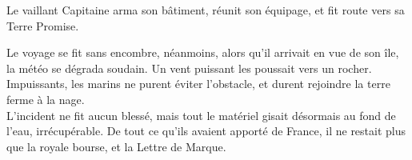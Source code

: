 \culdelampe{}

Le vaillant Capitaine arma son bâtiment, réunit son équipage, et fit route vers sa Terre Promise.

Le voyage se fit sans encombre, néanmoins, alors qu'il arrivait en vue de son île, la météo se dégrada soudain. Un vent puissant les poussait vers un rocher. Impuissants, les marins ne purent éviter l'obstacle, et durent rejoindre la terre ferme à la nage.\\

L'incident ne fit aucun blessé, mais tout le matériel gisait désormais au fond de l'eau, irrécupérable. De tout ce qu'ils avaient apporté de France, il ne restait plus que la royale bourse, et la Lettre de Marque.\\


